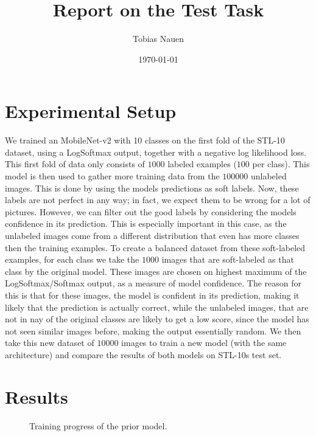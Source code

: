 \documentclass[a4paper,onecolumn,oneside,11pt,english,bibliography=totoc]{article}
\title{Report on the Test Task}
\author{
	Tobias Nauen
}
\date{\today}
\newcommand{\1}{\mathds{1}}
\theoremstyle{breakit}
\theoremstyle{break}
\begin{document}
	\maketitle
	\section*{Experimental Setup}
	We trained an MobileNet-v2 with 10 classes on the first fold of the STL-10 dataset, using a LogSoftmax output, together with a negative log likelihood loss. This first fold of data only consists of $1000$ labeled examples ($100$ per class). This model is then used to gather more training data from the $100 000$ unlabeled images. This is done by using the models predictions as soft labels. Now, these labels are not perfect in any way; in fact, we expect them to be wrong for a lot of pictures. However, we can filter out the good labels by considering the models confidence in its prediction. This is especially important in this case, as the unlabeled images come from a different distribution that even has more classes then the training examples. To create a balanced dataset from these soft-labeled examples, for each class we take the $1000$ images that are soft-labeled as that class by the original model. These images are chosen on highest maximum of the LogSoftmax/Softmax output, as a measure of model confidence. The reason for this is that for these images, the model is confident in its prediction, making it likely that the prediction is actually correct, while the unlabeled images, that are not in nay of the original classes are likely to get a low score, since the model has not seen similar images before, making the output essentially random. We then take this new dataset of $10000$ images to train a new model (with the same architecture) and compare the results of both models on STL-10s test set.
	
	\section*{Results}
	\begin{figure}[h]
	    \centering
	    \resizebox{\textwidth}{!}{}
	    \caption{Training progress of the prior model.}
	    \label{fig:training_prior}
	\end{figure}
	
	\begin{table}[h]
	    \centering
	    \caption{Stats of the soft-labeled dataset of $10000$ images.}
	    \label{tab:soft_dataset_stats}
	\end{table}
	
\end{document}
